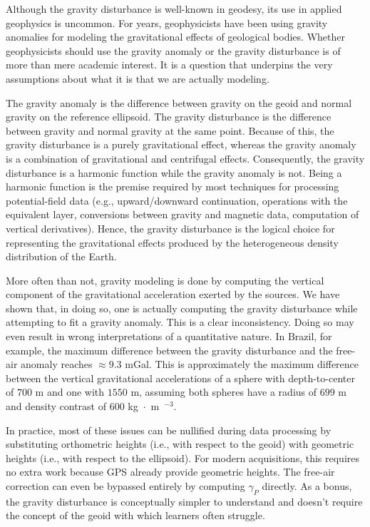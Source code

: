 \documentclass[manuscript]{geophysics}
\begin{document}
Although the gravity disturbance is well-known in geodesy,
its use in applied geophysics is uncommon.
For years, geophysicists have been using gravity anomalies for modeling
the gravitational effects of geological bodies.
Whether geophysicists should use the gravity anomaly or the gravity disturbance
is of more than mere academic interest.
It is a question that underpins the very assumptions about what it is that we
are actually modeling.

The gravity anomaly is the difference between
gravity on the geoid and normal gravity on the reference ellipsoid.
The gravity disturbance is the difference between gravity and normal gravity at
the same point.
Because of this, the gravity disturbance is a purely gravitational effect,
whereas the gravity anomaly is a combination of gravitational and centrifugal
effects.
Consequently, the gravity disturbance is a harmonic function while the
gravity anomaly is not.
Being a harmonic function is the premise required by most techniques for
processing potential-field data
(e.g., upward/downward continuation, operations with the equivalent layer,
conversions between gravity and magnetic data, computation of vertical
derivatives).
Hence, the gravity disturbance is the logical choice for
representing the gravitational effects produced by the heterogeneous density
distribution of the Earth.

More often than not, gravity modeling is done by computing the
vertical component of the gravitational acceleration exerted by the sources.
We have shown that, in doing so, one is actually computing the gravity
disturbance while attempting to fit a gravity anomaly.
This is a clear inconsistency.
Doing so may even result in wrong interpretations of a quantitative nature.
In Brazil, for example, the maximum difference
between the gravity disturbance and the free-air anomaly reaches $\approx 9.3$ mGal.
This is approximately the maximum difference between the vertical gravitational
accelerations of a sphere with depth-to-center of $700$ m and one with $1550$ m,
assuming both spheres have a radius of $699$ m and density contrast of
$600$ kg~$\cdot$~m~$^{-3}$.

In practice, most of these issues can be nullified during data processing by
substituting orthometric heights (i.e., with respect to the geoid) with
geometric heights (i.e., with respect to the ellipsoid).
For modern acquisitions, this requires no extra work because GPS already
provide geometric heights.
The free-air correction can even be bypassed entirely by computing $\gamma_P$
directly.
As a bonus, the gravity disturbance is conceptually simpler to understand and
doesn't require the concept of the geoid with which learners often struggle.
\end{document}
